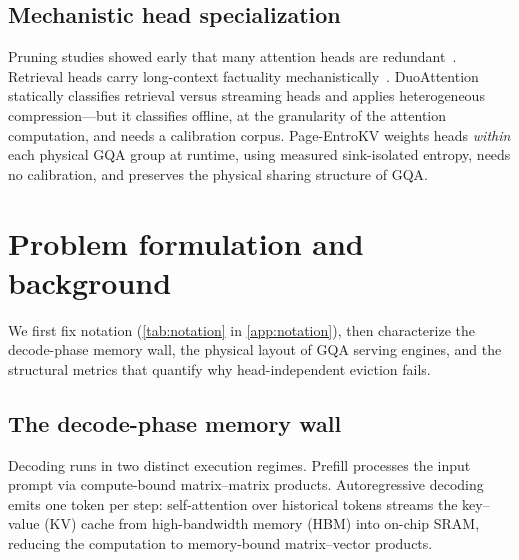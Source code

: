 \documentclass[final,5p,times,twocolumn]{elsarticle}
\theoremstyle{definition}
\theoremstyle{remark}
\newcommand{\method}{Page-EntroKV}
\begin{document}
\subsection{Mechanistic head specialization}
Pruning studies showed early that many attention heads are
redundant~\cite{michel2019heads,voita2019analyzing}. Retrieval heads
carry long-context factuality
mechanistically~\cite{wu2024retrievalheads}. DuoAttention~%
\cite{xiao2024duoattention} statically classifies retrieval versus
streaming heads and applies heterogeneous compression---but it
classifies offline, at the granularity of the attention computation, and
needs a calibration corpus. \method{} weights heads \emph{within} each
physical GQA group at runtime, using measured sink-isolated entropy,
needs no calibration, and preserves the physical sharing structure of
GQA.

\section{Problem formulation and background}
\label{sec:background}

We first fix notation (\cref{tab:notation} in \cref{app:notation}), then
characterize the decode-phase memory wall, the physical layout of GQA
serving engines, and the structural metrics that quantify why
head-independent eviction fails.

\subsection{The decode-phase memory wall}
\label{subsec:roofline}

Decoding runs in two distinct execution regimes. Prefill processes the
input prompt via compute-bound matrix--matrix products. Autoregressive
decoding emits one token per step: self-attention over historical
tokens streams the key--value (KV) cache from high-bandwidth memory
(HBM) into on-chip SRAM, reducing the computation to memory-bound
matrix--vector products.
\end{document}
